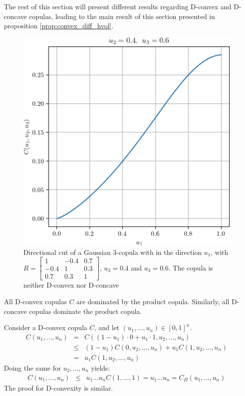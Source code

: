 The rest of this section will present different results regarding D-convex and D-concave copulas, leading to the main result of this section presented in proposition \ref{prop:convex_diff_hvol}.

\begin{figure}
    \centering
    \includegraphics[width=0.5\linewidth]{Images/Gaussian_copula/gaussian_copula_n3.png}
    \caption{Directional cut of a Gaussian 3-copula with in the direction $u_1$, with $R=\begin{bmatrix} 1 & -0.4 & 0.7\\ -0.4 & 1 & 0.3\\ 0.7 & 0.3 & 1 \end{bmatrix}$, $u_2=0.4$ and $u_3=0.6$. The copula is neither D-convex nor D-concave}
    \label{fig:gaussian_copula_simu_n3}
\end{figure}

\begin{remark}
    All D-convex copulas $C$ are dominated by the product copula. Similarly, all D-concave copulas dominate the product copula.

    Consider a D-convex copula $C$, and let $(u_1, \dots, u_n)\in[0,1]^n$.
    \begin{eqnarray*}
        C(u_1,\dots, u_n) &=& C((1-u_1)\cdot0+u_1\cdot 1, u_2, \dots, u_n)\\
        &\leqslant& (1-u_1)C(0, u_2,\dots, u_n)+u_1C(1, u_2, \dots, u_n)\\
        &=& u_1C(1, u_2,\dots, u_n)
    \end{eqnarray*}
    Doing the same for $u_2,\dots,u_n$ yields:
    \begin{eqnarray*}
        C(u_1,\dots, u_n) &\leqslant& u_1\dots u_nC(1,\dots,1) = u_1\dots u_n = C_\Pi(u_1,\dots,u_n)
    \end{eqnarray*}
    The proof for D-convexity is similar.
\end{remark}

